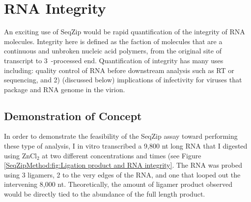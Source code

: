 \section{RNA Integrity}
  \label{SeqZipMethod:sec:RNA Integrity via SeqZip}

  An exciting use of SeqZip would be rapid quantification of the integrity of RNA molecules. Integrity here is defined as the faction of molecules that are a continuous and unbroken nucleic acid polymers, from the original site of transcript to 3\textprime~-processed end. Quantification of integrity has many uses including: quality control of RNA before downstream analysis such as RT or sequencing, and 2) (discussed below) implications of infectivity for viruses that package and RNA genome in the virion.

  \subsection{Demonstration of Concept}
    \label{SeqZipMethod:subsec:SeqZip can be used to examine viral genomes}

    In order to demonstrate the feasibility of the SeqZip assay toward performing these type of analysis, I in vitro transcribed a 9,800 nt long RNA that I digested using ZnCl$_{2}$ at two different concentrations and times (see Figure \ref{SeqZipMethod:fig:Ligation product and RNA integrity}. The RNA was probed using 3 ligamers, 2 to the very edges of the RNA, and one that looped out the intervening 8,000 nt. Theoretically, the amount of ligamer product observed would be directly tied to the abundance of the full length product.

